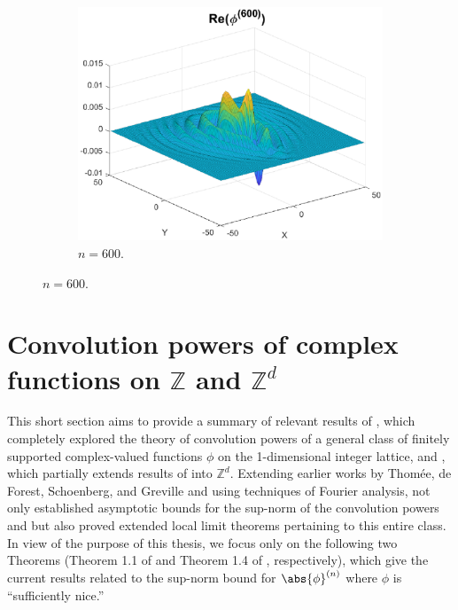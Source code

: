\documentclass[11pt, letter]{book}
\newenvironment{example}
  {\pushQED{\qed}\renewcommand{\qedsymbol}{$\triangle$}\examplex}
  {\popQED\endexamplex}
\begin{document}
\begin{example}
\begin{figure}[!htb]
\begin{subfigure}{0.49\textwidth}
    \includegraphics[scale=0.54]{conv_ex1.eps}
    \caption{$n = 600$.}
    \end{subfigure}
\end{figure}
\end{example}



\section{Convolution powers of complex functions on $\mathbb{Z}$ and $\mathbb{Z}^d$}

This short section aims to provide a summary of relevant results of \cite{randles_convolution_2015}, which completely explored the theory of convolution powers of a general class of finitely supported complex-valued functions $\phi$ on the 1-dimensional integer lattice, and \cite{randles_convolution_2017}, which partially extends results of \cite{randles_convolution_2015} into $\mathbb{Z}^d$. Extending earlier
works by Thom\'{e}e, de Forest, Schoenberg, and Greville and using techniques of Fourier analysis, \cite{randles_convolution_2015} not only established asymptotic bounds for the sup-norm of the convolution powers and but also proved extended local limit theorems pertaining to this entire class. In view of the purpose of this thesis, we focus only on the following two Theorems (Theorem 1.1 of \cite{randles_convolution_2015} and Theorem 1.4 of \cite{randles_convolution_2017}, respectively), which give the current results related to the sup-norm bound for $\abs{\phi}^{(n)}$ where $\phi$ is ``sufficiently nice.''
\end{document}
